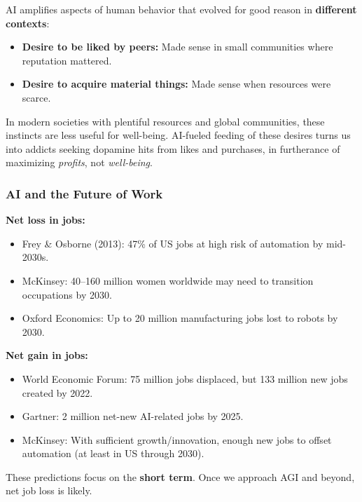 \begin{tipbox}
AI amplifies aspects of human behavior that evolved for good reason in \textbf{different contexts}:
\begin{itemize}
  \item \textbf{Desire to be liked by peers:} Made sense in small communities where reputation mattered.
  \item \textbf{Desire to acquire material things:} Made sense when resources were scarce.
\end{itemize}
In modern societies with plentiful resources and global communities, these instincts are less useful for well-being. AI-fueled feeding of these desires turns us into addicts seeking dopamine hits from likes and purchases, in furtherance of maximizing \textit{profits}, not \textit{well-being}.
\end{tipbox}

\bigseparator

\subsubsection{AI and the Future of Work}

\begin{keybox}
\textbf{Net loss in jobs:}
\begin{itemize}
  \item Frey \& Osborne (2013): 47\% of US jobs at high risk of automation by mid-2030s.
  \item McKinsey: 40--160 million women worldwide may need to transition occupations by 2030.
  \item Oxford Economics: Up to 20 million manufacturing jobs lost to robots by 2030.
\end{itemize}

\textbf{Net gain in jobs:}
\begin{itemize}
  \item World Economic Forum: 75 million jobs displaced, but 133 million new jobs created by 2022.
  \item Gartner: 2 million net-new AI-related jobs by 2025.
  \item McKinsey: With sufficient growth/innovation, enough new jobs to offset automation (at least in US through 2030).
\end{itemize}
\end{keybox}

\begin{tipbox}
These predictions focus on the \textbf{short term}. Once we approach AGI and beyond, net job loss is likely.
\end{tipbox}

